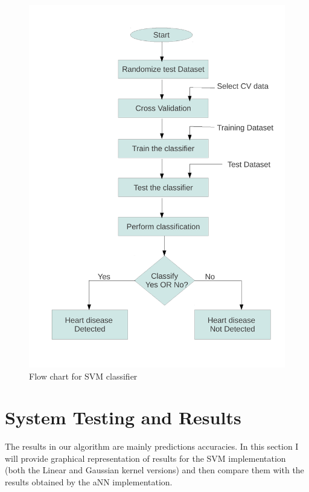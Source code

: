 \documentclass[11pt,a4paper]{report}
\begin{document}
{\begin{figure}[H]
\begin{center}
\includegraphics[width=13cm]{2.pdf}
\captionsetup{width=13cm}
\caption{Flow chart for SVM classifier}
\end{center}
\end{figure}




\chapter{System Testing and Results}

The results in our algorithm are mainly predictions accuracies. In this section I will provide graphical representation of results for the SVM implementation (both the Linear and Gaussian kernel versions) and then compare them with the results obtained by the aNN implementation. 

}
\end{document}
